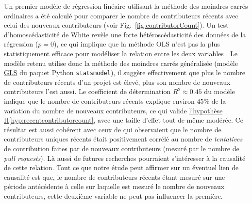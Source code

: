 \documentclass[dvipsnames,runningheads]{llncs}
\newcommand{\en}[1]{\foreignlanguage{english}{\emph{#1}}}
\begin{document}
    Un premier modèle de régression linéaire utilisant la méthode des moindres carrés ordinaires a été calculé
    pour comparer le nombre de contributeurs récents avec celui des nouveaux contributeurs (voir
    Fig.~\ref{fig:contributorCount}). Un test d'homoscédasticité de White revèle une forte hétéroscédasticité
    des données de la régression ($p = 0$), ce qui implique que la méthode OLS n'est pas la plus
    statistiquement efficace pour modéliser la relation entre les deux variables \parencite{GLS-2021}. Le
    modèle retenu utilise donc la méthode des moindres carrés généralisée (modèle
    \href{https://www.statsmodels.org/dev/generated/statsmodels.regression.linear_model.GLS.html}{GLS} du
    paquet Python \texttt{statsmodel}), il suggère effectivement que plus le nombre de contributeurs récents
    d'un projet est élevé, plus son nombre de nouveaux contributeurs l'est aussi. Le coefficient de
    détermination $R^2 \approx 0.45$ du modèle indique que le nombre de contributeurs récents explique environ
    $45\%$ de la variation du nombre de nouveaux contributeurs, ce qui valide
    \hyperref[hyp:recentcontributorcount]{l'hypothèse H\ref*{hyp:recentcontributorcount}}, avec une taille
    d'effet tout de même modérée. Ce résultat est aussi cohérent avec ceux de
    \textcite[p.~12-13,16]{signals-2019} qui observaient que le nombre de contributeurs uniques récents était
    positivement corrélé au nombre de \emph{tentatives} de contribution faites par de nouveaux contributeurs
    (mesuré par le nombre de \en{pull requests}). Là aussi de futures recherches pourraient s'intéresser à la
    causalité de cette relation. Tout ce que notre étude peut affirmer sur un éventuel lien de causalité est
    que, le nombre de contributeurs récents étant mesuré sur une période antécédente à celle sur laquelle est
    mesuré le nombre de nouveaux contributeurs, cette deuxième variable ne peut pas influencer la première.
\end{document}

